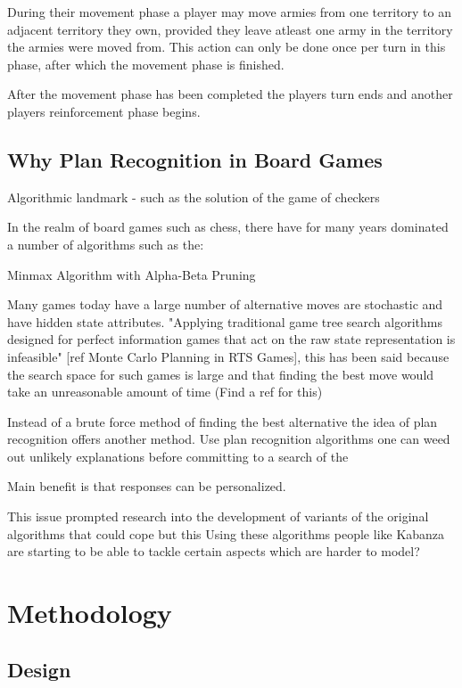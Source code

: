 \documentclass[parskip]{cs4rep}
\begin{document}
During their movement phase a player may move armies from one territory to an adjacent territory they own, provided they leave atleast one army in the territory the armies were moved from. This action can only be done once per turn in this phase, after which the movement phase is finished.

After the movement phase has been completed the players turn ends and another players reinforcement phase begins.
\newpage

\section{Why Plan Recognition in Board Games}

Algorithmic landmark - such as the solution of the game of checkers 

In the realm of board games such as chess, there have for many years dominated a number of algorithms such as the:

Minmax Algorithm with Alpha-Beta Pruning

Many games today have a large number of alternative moves are stochastic and have hidden state attributes. "Applying traditional game tree search algorithms designed for perfect information games that act on the raw state representation is infeasible" [ref Monte Carlo Planning in RTS Games], this has been said because the search space for such games is large and that finding the best move would take an unreasonable amount of time (Find a ref for this)

Instead of a brute force method of finding the best alternative the idea of plan recognition offers another method. Use plan recognition algorithms one can weed out unlikely explanations before committing to a search of the 

Main benefit is that responses can be personalized.

This issue prompted research into the development of variants of the original algorithms that could cope but this 
Using these algorithms people like Kabanza are starting to be able to tackle certain aspects which are harder to model?

\chapter{Methodology}

\section{Design}
\end{document}

